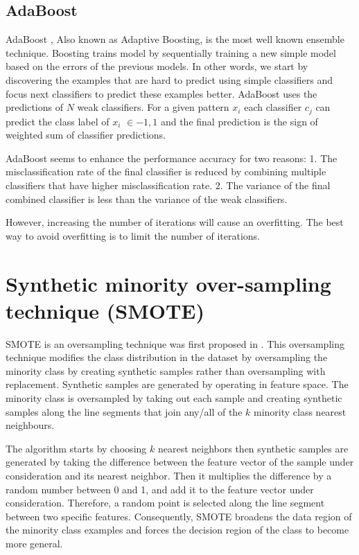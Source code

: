 \documentclass[runningheads,a4paper]{llncs}
\begin{document}
\subsection{AdaBoost}
AdaBoost \cite{schapire2013}, Also known as Adaptive Boosting, is the most well known ensemble technique. Boosting trains model by sequentially training a new simple model based on the errors of the previous models. In other words, we start by discovering the examples that are hard to predict using simple classifiers and focus next classifiers to predict these examples better.
AdaBoost uses the predictions of $N$ weak classifiers. For a given pattern $x_i$ each classifier $c_j$ can predict the class label of $x_i$ $\in {-1,1}$ and the final prediction is the sign of weighted sum of classifier predictions.

AdaBoost seems to enhance the performance accuracy for two reasons:
1. The misclassification rate of the final classifier is reduced by combining multiple classifiers that have higher misclassification rate.
2.  The variance of the final combined classifier is less than the variance of the weak classifiers.

However, increasing the number of iterations will cause an overfitting. The best way to avoid overfitting is to limit the number of iterations.

\section{Synthetic minority over-sampling technique (SMOTE)}
\label{SMOTTE}

SMOTE is an oversampling technique was first proposed in \cite{chawla2002smote}. This oversampling technique modifies the class distribution in the dataset by oversampling the minority class by creating synthetic samples rather than oversampling with replacement. Synthetic samples are generated by operating in feature space.
The minority class is oversampled by taking out each sample and creating synthetic samples along the line segments that join any/all of the $k$ minority class nearest neighbours. 

The algorithm starts by choosing $k$ nearest neighbors then synthetic samples
are generated by taking the difference between the feature vector of the sample
under consideration and its nearest neighbor. Then it multiplies the difference by a random number between 0 and 1, and add it to the feature vector under consideration. Therefore, a random point is selected along the line segment between two specific features. Consequently, SMOTE broadens the data region of the minority class examples and forces the decision region of the class to become more general.
\end{document}
